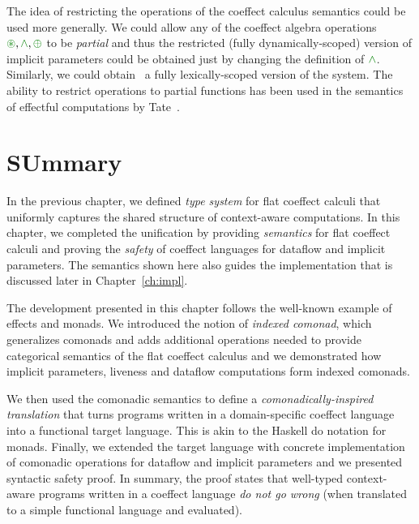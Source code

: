 The idea of restricting the operations of the coeffect calculus semantics could be used more
generally. We could allow any of the coeffect algebra operations $\cseq, \czip, \cpar$ to be
\emph{partial} and thus the restricted (fully dynamically-scoped) version of implicit parameters
could be obtained just by changing the definition of $\czip$. Similarly, we could obtain \eg~a
fully lexically-scoped version of the system. The ability to restrict operations to partial 
functions has been used in the semantics of effectful computations by Tate~\cite{effects-producer-semantics}.



%
%



\section{SUmmary}

In the previous chapter, we defined \emph{type system} for flat coeffect calculi that uniformly
captures the shared structure of context-aware computations. In this chapter, we completed
the unification by providing \emph{semantics} for flat coeffect calculi and proving the
\emph{safety} of coeffect languages for dataflow and implicit parameters. The semantics shown
here also guides the implementation that is discussed later in Chapter~\ref{ch:impl}.

The development presented in this chapter follows the well-known example of effects and monads.
We introduced the notion of \emph{indexed comonad}, which generalizes comonads
and adds additional operations needed to provide categorical semantics of the flat coeffect 
calculus and we demonstrated how implicit parameters, liveness and dataflow computations form
indexed comonads.

We then used the comonadic semantics to define a \emph{comonadically-inspired translation}
that turns programs written in a domain-specific coeffect language into a functional target 
language. This is akin to the Haskell do notation for monads. Finally, we extended the target
language with concrete implementation of comonadic operations for dataflow and implicit parameters
and we presented syntactic safety proof. In summary, the proof states that well-typed 
context-aware programs written in a coeffect language \emph{do not go wrong} (when translated
to a simple functional language and evaluated).

